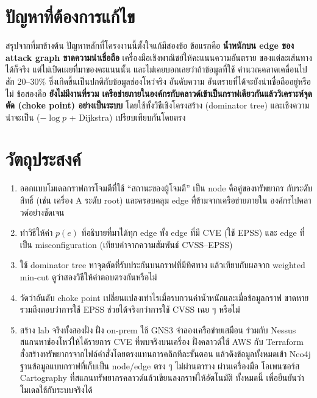 \section{ปัญหาที่ต้องการแก้ไข}\label{sec:intro-problem}

สรุปจากที่มาข้างต้น ปัญหาหลักที่โครงงานนี้ตั้งใจแก้มีสองข้อ ข้อแรกคือ \textbf{น้ำหนักบน
edge ของ attack graph ขาดความน่าเชื่อถือ} เครื่องมือเชิงพาณิชย์ให้คะแนนความอันตราย
ของแต่ละเส้นทางได้ก็จริง แต่ไม่เปิดเผยที่มาของคะแนนนั้น และไม่เคยบอกเลยว่าถ้าข้อมูลที่ใช้
คำนวณคลาดเคลื่อนไปสัก 20--30\% ซึ่งเกิดขึ้นเป็นปกติกับข้อมูลช่องโหว่จริง อันดับความ
อันตรายที่ได้จะยังน่าเชื่อถืออยู่หรือไม่ ข้อสองคือ \textbf{ยังไม่มีงานที่รวม
เครือข่ายภายในองค์กรกับคลาวด์เข้าเป็นกราฟเดียวกันแล้ววิเคราะห์จุดตัด (choke point)
อย่างเป็นระบบ} โดยใช้ทั้งวิธีเชิงโครงสร้าง (dominator tree) และเชิงความน่าจะเป็น
($-\log p$ + Dijkstra) เปรียบเทียบกันโดยตรง

\section{วัตถุประสงค์}\label{sec:intro-objectives}

\begin{enumerate}[leftmargin=1.6em]
\item ออกแบบโมเดลกราฟการโจมตีที่ใช้ ``สถานะของผู้โจมตี'' เป็น node คือคู่ของทรัพยากร
กับระดับสิทธิ์ (เช่น เครื่อง A ระดับ root) และครอบคลุม edge ที่ข้ามจากเครือข่ายภายใน
องค์กรไปคลาวด์อย่างชัดเจน
\item ทำวิธีให้ค่า $p(e)$ ที่อธิบายที่มาได้ทุก edge ทั้ง edge ที่มี CVE (ใช้ EPSS) และ edge
ที่เป็น misconfiguration (เทียบค่าจากความสัมพันธ์ CVSS--EPSS)
\item ใช้ dominator tree หาจุดตัดที่รับประกันบนกราฟที่มีทิศทาง แล้วเทียบกับผลจาก
weighted min-cut ดูว่าสองวิธีให้คำตอบตรงกันหรือไม่
\item วัดว่าอันดับ choke point เปลี่ยนแปลงเท่าไรเมื่อรบกวนค่าน้ำหนักและเมื่อข้อมูลกราฟ
ขาดหาย รวมถึงตอบว่าการใช้ EPSS ช่วยได้จริงกว่าการใช้ CVSS เฉย ๆ หรือไม่
\item สร้าง lab จริงทั้งสองฝั่ง ฝั่ง on-prem ใช้ GNS3 จำลองเครือข่ายเสมือน ร่วมกับ Nessus
สแกนหาช่องโหว่ให้ได้รายการ CVE ที่พบจริงบนเครื่อง ฝั่งคลาวด์ใช้ AWS กับ Terraform
สั่งสร้างทรัพยากรจากไฟล์คำสั่งโดยตรงแทนการคลิกทีละขั้นตอน แล้วดึงข้อมูลทั้งหมดเข้า
Neo4j ฐานข้อมูลแบบกราฟที่เก็บเป็น node/edge ตรง ๆ ไม่ผ่านตาราง ผ่านเครื่องมือ
โอเพนซอร์ส Cartography ที่สแกนทรัพยากรคลาวด์แล้วเขียนลงกราฟให้อัตโนมัติ ทั้งหมดนี้
เพื่อยืนยันว่าโมเดลใช้กับระบบจริงได้
\end{enumerate}


